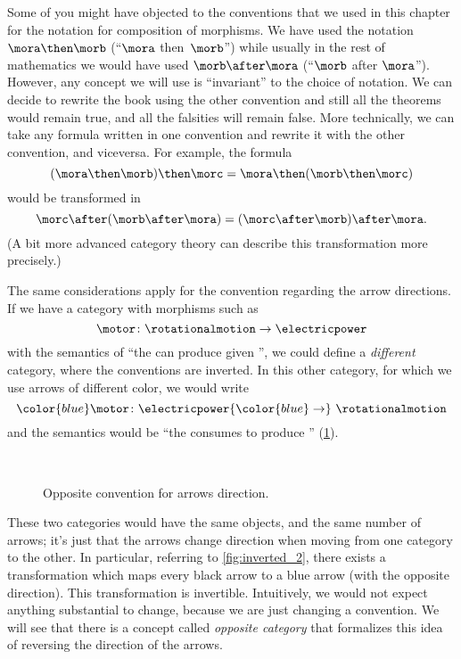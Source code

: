 Some of you might have objected to the conventions that we used in this chapter for the notation for composition of morphisms. We have used the notation $\mora \then \morb$ (``$\mora$ then~$\morb$'') while usually in the rest of mathematics we would have used $\morb \after \mora$ (``$\morb$ after $\mora$''). However, any concept we will use is ``invariant'' to the choice of notation. We can decide to rewrite the book using the other convention and still all the theorems would remain true, and all the falsities will remain false. More technically, we can take any formula written in one convention and rewrite it with the other convention, and viceversa. For example, the formula
%
\begin{equation*}
  (\mora \then \morb) \then \morc = \mora \then (\morb \then \morc)
\end{equation*}
%
would be transformed in
%
\begin{equation*}
  \morc \after (\morb \after \mora) = (\morc \after \morb) \after \mora.
\end{equation*}
%
(A bit more advanced category theory can describe this transformation more precisely.)

The same considerations apply for the convention regarding the arrow directions.
If we have a category with morphisms such as
\begin{equation*}
  \motor \colon \rotationalmotion \to \electricpower
\end{equation*}
with the semantics of ``the \motor can produce \rotationalmotion given \electricpower'', we could define a \emph{different} category, where the conventions are inverted.
In this other category, for which we use arrows of different color, we would write
\begin{equation*}
{\color{blue}\motor}
  \colon \electricpower {\color{blue} \to}\  \rotationalmotion
\end{equation*}
and the semantics would be ``the \motor consumes \electricpower to produce \rotationalmotion'' (\cref{fig:inverted}).


\begin{figure}[h!]
  \centering
  \\[+15pt]
  \caption{Opposite convention for arrows direction. \label{fig:inverted}}
\end{figure}


These two categories would have the same objects, and the same number of arrows; it's just
that the arrows change direction when moving from one category to the other. In particular, referring to \cref{fig:inverted_2}, there exists a transformation which maps every black arrow to a blue arrow (with the opposite direction). This transformation is invertible.
Intuitively, we would not expect anything substantial to change, because we are
just changing a convention. We will see that there is a concept called \emph{opposite category}
that formalizes this idea of reversing the direction of the arrows.

